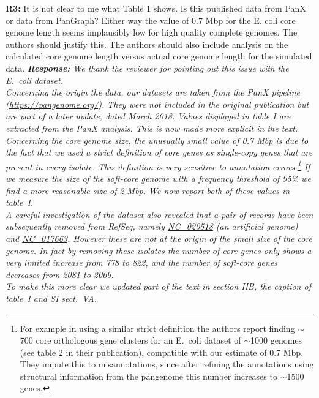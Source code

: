 \documentclass[aps,rmp,onecolumn]{revtex4-1}
\newcommand{\reviewer}[2]{\textbf{#1:} #2\vskip 5mm}
\newcommand{\response}[1]{{\it {\color{response}\textbf{Response:} #1}}\vskip 5mm}
\newcommand{\SIdataBenchmark}{V}
\begin{document}
\reviewer{R3}{It is not clear to me what Table 1 shows. Is this published data from PanX or data from PanGraph? Either way the value of 0.7 Mbp for the E. coli core genome length seems implausibly low for high quality complete genomes. The authors should justify this. The authors should also include analysis on the calculated core genome length versus actual core genome length for the simulated data.}
\response{
We thank the reviewer for pointing out this issue with the E.~coli dataset.\\

Concerning the origin the data, our datasets are taken from the PanX pipeline (\url{https://pangenome.org/}). They were not included in the original publication but are part of a later update, dated March 2018. Values displayed in table I are extracted from the PanX analysis. This is now made more explicit in the text.\\

Concerning the core genome size, the unusually small value of 0.7 Mbp is due to the fact that we used a strict definition of core genes as single-copy genes that are present in every isolate. This definition is very sensitive to annotation errors.\footnote{
      For example in \cite{sutton2021pan} using a similar strict definition the authors report finding $\sim$700 core orthologous gene clusters for an E.~coli dataset of $\sim$1000 genomes (see table 2 in their publication), compatible with our estimate of 0.7 Mbp. They impute this to misannotations, since after refining the annotations using structural information from the pangenome this number increases to $\sim$1500 genes.
} If we measure the size of the soft-core genome with a frequency threshold of 95\% we find a more reasonable size of 2 Mbp. We now report both of these values in table~I.\\
A careful investigation of the dataset also revealed that a pair of records have been subsequently removed from RefSeq, namely \href{https://www.ncbi.nlm.nih.gov/nuccore/NC_020518.1?report=genbank}{NC\_020518} (an artificial genome) and  \href{https://www.ncbi.nlm.nih.gov/nuccore/NC_017663.1?report=genbank}{NC\_017663}. However these are not at the origin of the small size of the core genome. In fact by removing these isolates the number of core genes only shows a very limited increase from 778 to 822, and the number of soft-core genes decreases from 2081 to 2069.\\ 

To make this more clear we updated part of the text in section IIB, the caption of table~I and SI sect.~{\SIdataBenchmark}A.
}
\end{document}

